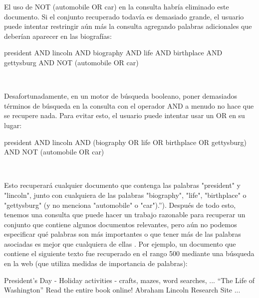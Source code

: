 El uso de NOT (automobile OR car) en la consulta habría eliminado este documento. Si el conjunto recuperado todavía es demasiado grande, el usuario puede intentar restringir aún más la consulta agregando palabras adicionales que deberían aparecer en las biografías:

\begin{center}
	\begin{minipage}{13cm}	
		president AND lincoln AND biography AND life AND birthplace AND gettysburg AND NOT (automobile OR car)\\
	\end{minipage}\\
\end{center}

Desafortunadamente, en un motor de búsqueda booleano, poner demasiados términos de búsqueda en la consulta con el operador AND a menudo no hace que se recupere nada. Para evitar esto, el usuario puede intentar usar un OR en su lugar:

\begin{center}
	\begin{minipage}{13cm}	
		president AND lincoln AND (biography OR life OR birthplace OR gettysburg) AND NOT (automobile OR car)\\
	\end{minipage}\\
\end{center}

Esto recuperará cualquier documento que contenga las palabras "president" y "lincoln", junto con cualquiera de las palabras "biography", "life", "birthplace" o "gettysburg" (y no menciona "automobile" o "car").”). Después de todo esto, tenemos una consulta que puede hacer un trabajo razonable para recuperar un conjunto que contiene algunos documentos relevantes, pero aún no podemos especificar qué palabras son más importantes o que tener más de las palabras asociadas es mejor que cualquiera de ellas . Por ejemplo, un documento que contiene el siguiente texto fue recuperado en el rango 500 mediante una búsqueda en la web (que utiliza medidas de importancia de palabras):

\begin{center}
	\begin{minipage}{13cm}	
		President’s Day - Holiday activities - crafts, mazes, word searches, ... “The Life of Washington” Read the entire book online! Abraham Lincoln Research Site ...
	\end{minipage}\\
\end{center}

